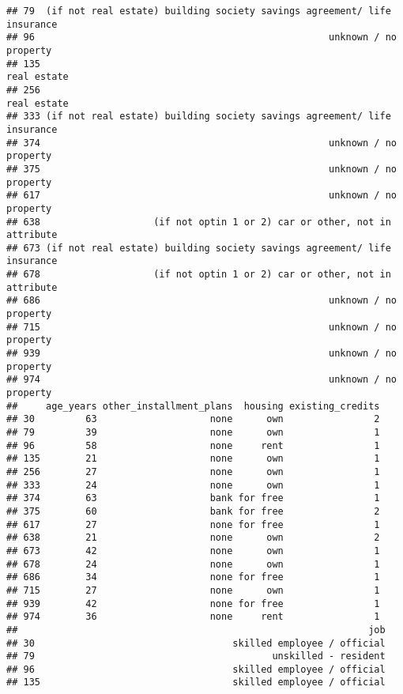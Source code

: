 \documentclass[
]{article}
\begin{document}
\begin{verbatim}
## 79  (if not real estate) building society savings agreement/ life insurance
## 96                                                    unknown / no property
## 135                                                             real estate
## 256                                                             real estate
## 333 (if not real estate) building society savings agreement/ life insurance
## 374                                                   unknown / no property
## 375                                                   unknown / no property
## 617                                                   unknown / no property
## 638                    (if not optin 1 or 2) car or other, not in attribute
## 673 (if not real estate) building society savings agreement/ life insurance
## 678                    (if not optin 1 or 2) car or other, not in attribute
## 686                                                   unknown / no property
## 715                                                   unknown / no property
## 939                                                   unknown / no property
## 974                                                   unknown / no property
##     age_years other_installment_plans  housing existing_credits
## 30         63                    none      own                2
## 79         39                    none      own                1
## 96         58                    none     rent                1
## 135        21                    none      own                1
## 256        27                    none      own                1
## 333        24                    none      own                1
## 374        63                    bank for free                1
## 375        60                    bank for free                2
## 617        27                    none for free                1
## 638        21                    none      own                2
## 673        42                    none      own                1
## 678        24                    none      own                1
## 686        34                    none for free                1
## 715        27                    none      own                1
## 939        42                    none for free                1
## 974        36                    none     rent                1
##                                                              job
## 30                                   skilled employee / official
## 79                                          unskilled - resident
## 96                                   skilled employee / official
## 135                                  skilled employee / official

\end{verbatim}
\end{document}

